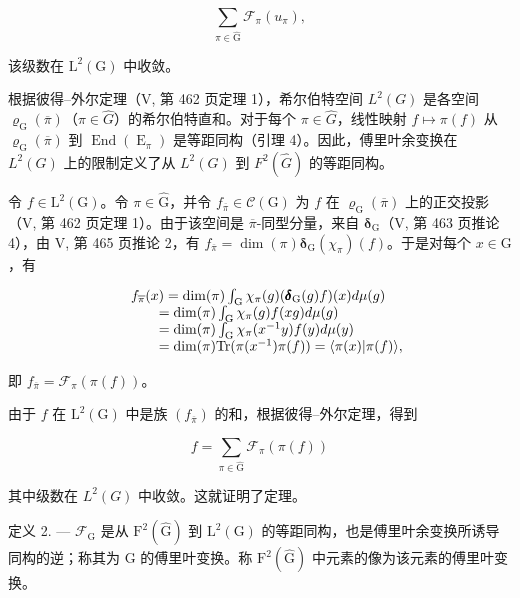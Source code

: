\[
\sum_ {\pi \in \widehat {\mathrm{G}}} \mathcal {F} _ {\pi} (u _ {\pi}),
\]

该级数在 \(\mathrm{L}^2 (\mathrm{G})\) 中收敛。

根据彼得–外尔定理（V, 第 462 页定理 1），希尔伯特空间 \(L^{2}(G)\) 是各空间 \(\varrho_{\mathrm{G}}(\overline{\pi})\)（\(\pi \in \widehat{G}\)）的希尔伯特直和。对于每个 \(\pi \in \widehat{G}\)，线性映射 \(f \mapsto \pi(f)\) 从 \(\varrho_{\mathrm{G}}(\overline{\pi})\) 到 \(\operatorname{End}(\operatorname{E}_{\pi})\) 是等距同构（引理 4）。因此，傅里叶余变换在 \(L^{2}(G)\) 上的限制定义了从 \(L^{2}(G)\) 到 \(F^{2}(\widehat{G})\) 的等距同构。

令 \(f \in \mathrm{L}^2(\mathrm{G})\)。令 \(\pi \in \widehat{\mathrm{G}}\)，并令 \(f_{\overline{\pi}} \in \mathcal{C}(\mathrm{G})\) 为 \(f\) 在 \(\varrho_{\mathrm{G}}(\overline{\pi})\) 上的正交投影（V, 第 462 页定理 1）。由于该空间是 \(\overline{\pi}\)-同型分量，来自 \(\pmb{\delta}_{\mathrm{G}}\)（V, 第 463 页推论 4），由 V, 第 465 页推论 2，有 \(f_{\overline{\pi}} = \dim(\pi)\pmb{\delta}_{\mathrm{G}}(\chi_{\pi})(f)\)。于是对每个 \(x \in \mathrm{G}\)，有

\[
\begin{array}{r l} & {f _ {\overline {{\pi}}} (x) = \dim (\pi) \int_ {\mathrm{G}} \chi_ {\pi} (g) (\pmb {\delta} _ {\mathrm{G}} (g) f) (x) d \mu (g)} \\ & {\qquad = \dim (\pi) \int_ {\mathrm{G}} \chi_ {\pi} (g) f (x g) d \mu (g)} \\ & {\qquad = \dim (\pi) \int_ {\mathrm{G}} \chi_ {\pi} (x ^ {- 1} y) f (y) d \mu (y)} \\ & {\qquad = \dim (\pi) \mathrm{Tr} (\pi (x ^ {- 1}) \pi (f)) = \langle \pi (x) | \pi (f) \rangle ,} \end{array}
\]

即 \(f_{\overline{\pi}} = \mathcal{F}_{\pi}(\pi(f))\)。

由于 \(f\) 在 \(\mathrm{L}^2 (\mathrm{G})\) 中是族 \((f_{\overline{\pi}})\) 的和，根据彼得–外尔定理，得到

\[
f = \sum_ {\pi \in \widehat {\mathrm{G}}} \mathcal {F} _ {\pi} (\pi (f))
\]

其中级数在 \(L^{2}(G)\) 中收敛。这就证明了定理。

定义 2. --- \(\mathcal{F}_{\mathrm{G}}\) 是从 \(\mathrm{F}^2 (\widehat{\mathrm{G}})\) 到 \(\mathrm{L}^2 (\mathrm{G})\) 的等距同构，也是傅里叶余变换所诱导同构的逆；称其为 G 的傅里叶变换。称 \(\mathrm{F}^2 (\widehat{\mathrm{G}})\) 中元素的像为该元素的傅里叶变换。

